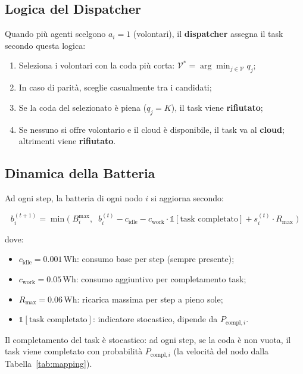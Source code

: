 \documentclass[11pt,a4paper]{article}
\begin{document}
\subsection{Logica del Dispatcher}

Quando pi\`u agenti scelgono $a_i = 1$ (volontari), il \textbf{dispatcher} assegna il task secondo questa logica:
\begin{enumerate}[nosep]
    \item Seleziona i volontari con la coda pi\`u corta: $\mathcal{V}^* = \arg\min_{j \in \mathcal{V}} q_j$;
    \item In caso di parit\`a, sceglie casualmente tra i candidati;
    \item Se la coda del selezionato \`e piena ($q_j = K$), il task viene \textbf{rifiutato};
    \item Se nessuno si offre volontario e il cloud \`e disponibile, il task va al \textbf{cloud}; altrimenti viene \textbf{rifiutato}.
\end{enumerate}

\subsection{Dinamica della Batteria}

Ad ogni step, la batteria di ogni nodo $i$ si aggiorna secondo:

\begin{equation}
b_i^{(t+1)} = \min\!\Big(\; B_i^{\max},\;\; b_i^{(t)} - c_{\text{idle}} - c_{\text{work}} \cdot \mathbb{1}[\text{task completato}] + s_i^{(t)} \cdot R_{\max} \;\Big)
\label{eq:battery}
\end{equation}

dove:
\begin{itemize}[nosep]
    \item $c_{\text{idle}} = 0.001$\,Wh: consumo base per step (sempre presente);
    \item $c_{\text{work}} = 0.05$\,Wh: consumo aggiuntivo per completamento task;
    \item $R_{\max} = 0.06$\,Wh: ricarica massima per step a pieno sole;
    \item $\mathbb{1}[\text{task completato}]$: indicatore stocastico, dipende da $P_{\text{compl},i}$.
\end{itemize}

Il completamento del task \`e stocastico: ad ogni step, se la coda \`e non vuota, il task viene completato con probabilit\`a $P_{\text{compl},i}$ (la velocit\`a del nodo dalla Tabella~\ref{tab:mapping}).
\end{document}
